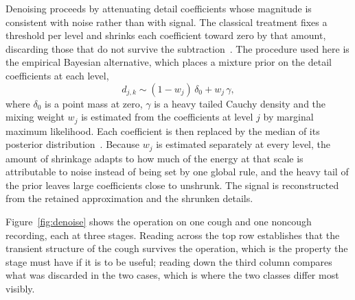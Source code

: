 Denoising proceeds by attenuating detail coefficients whose magnitude is
consistent with noise rather than with signal. The classical treatment fixes
a threshold per level and shrinks each coefficient toward zero by that
amount, discarding those that do not survive the
subtraction~\cite{donoho1994, donoho1995}. The procedure used here is the
empirical Bayesian alternative, which places a mixture prior on the detail
coefficients at each level,
\begin{equation}
d_{j,k} \sim (1 - w_j)\,\delta_0 + w_j\,\gamma,
\label{eq:eb}
\end{equation}
where $\delta_0$ is a point mass at zero, $\gamma$ is a heavy tailed Cauchy
density and the mixing weight $w_j$ is estimated from the coefficients at
level $j$ by marginal maximum likelihood. Each coefficient is then replaced
by the median of its posterior distribution~\cite{johnstone2005}. Because
$w_j$ is estimated separately at every level, the amount of shrinkage adapts
to how much of the energy at that scale is attributable to noise instead of
being set by one global rule, and the heavy tail of the prior leaves large
coefficients close to unshrunk. The signal is reconstructed from the retained
approximation and the shrunken details.

Figure~\ref{fig:denoise} shows the operation on one cough and one noncough
recording, each at three stages. Reading across the top row establishes that
the transient structure of the cough survives the operation, which is the
property the stage must have if it is to be useful; reading down the third
column compares what was discarded in the two cases, which is where the two
classes differ most visibly.

